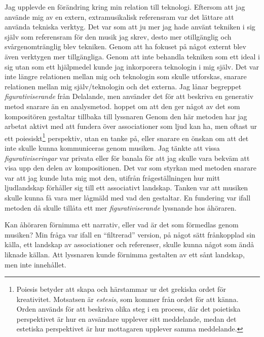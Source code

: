 \documentclass{article}
\begin{document}
Jag upplevde en förändring kring min relation till teknologi. Eftersom att jag använde mig av en extern,
extramusikalisk referensram var det lättare att använda tekniska verktyg. Det var som att ju mer jag hade
använt tekniken i sig själv som referensram för den musik jag skrev, desto mer otillgänglig och
svårgenomtränglig blev tekniken. Genom att ha fokuset på något externt blev även verktygen mer tillgängliga.
Genom att inte behandla tekniken som ett ideal i sig utan som ett hjälpmedel kunde jag inkorporera teknologin
i mig själv. Det var inte längre relationen mellan mig och teknologin som skulle utforskas, snarare relationen
mellan mig själv/teknologin och det externa. 
Jag lånar begreppet \emph{figurativiserande} från Delalande, men använder det för att beskriva en generativ
metod snarare än en  analysmetod. %
hoppet om att den ger något av det som kompositören gestaltar tillbaka till lyssnaren Genom den här metoden
har jag arbetat aktivt med att fundera över associationer som ljud kan ha, men oftast ur ett
poiesiskt\footnote{Poiesis betyder att skapa och härstammar ur det grekiska ordet för kreativitet. Motsatsen
är \emph {estesis}, som kommer från ordet för att känna. Orden används för att beskriva olika steg i en
process, där det poietiska perspektivet är hur en avsändare upplever sitt meddelande, medan det estetiska
perspektivet är hur mottagaren upplever samma meddelande.} perspektiv, utan en tanke på, eller snarare en önskan om att
det inte skulle kunna kommuniceras genom musiken. Jag tänkte att vissa \emph{figurativiseringar} var privata
eller för banala för att jag skulle vara bekväm att visa upp den delen av kompositionen. Det var som styrkan
med metoden snarare var att jag kunde luta mig mot den, utifrån frågeställningen hur mitt ljudlandskap
förhåller sig till ett associativt landskap. Tanken var att musiken skulle kunna få vara mer lågmäld med vad
den gestaltar. En fundering var ifall metoden då skulle tillåta ett mer \emph{figurativiserande} lyssnande hos
åhöraren.

Kan åhöraren förnimma ett narrativ, eller vad är det som förmedlas genom musiken? Min fråga var ifall en
``filtrerad'' version, på något sätt frånkopplad sin källa, ett landskap av associationer och referenser,
skulle kunna något som ändå liknade källan. Att lyssnaren kunde förnimma gestalten av ett sånt landskap, men inte innehållet. 


\pagebreak

\printbibliography[heading=subbibliography, title={Litteratur}, nottype=music, nottype=online, nottype=misc]
\printbibliography[heading=subbibliography, title={Musik}, type=music]
\printbibliography[heading=subbibliography, title={Uppslagsverk}, type=misc]
\printbibliography[heading=subbibliography, title={Webb}, type=online]
\end{document}
